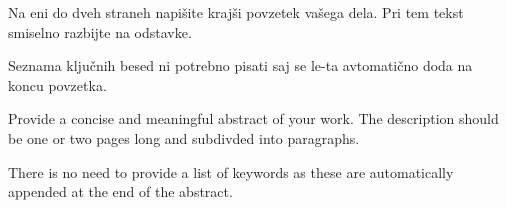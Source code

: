 








\begin{Povzetek}

Na eni do dveh straneh napišite krajši povzetek vašega dela. Pri tem tekst smiselno razbijte na odstavke. 

Seznama ključnih besed ni potrebno pisati saj se le-ta avtomatično doda na koncu povzetka.
\end{Povzetek}









\begin{Abstract}

Provide a concise and meaningful abstract of your work. The description should be one or two pages long and subdivded into paragraphs.

There is no need to provide a list of keywords as these are automatically appended at the end of the abstract.
\end{Abstract}
